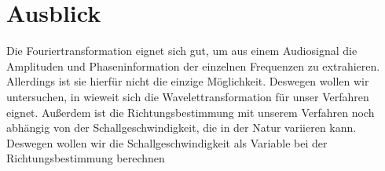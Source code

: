 \section{Ausblick} %
\iffalse
Da unser Verfahren über die Least Squares Methode sehr leicht auf eine beliebige Anzahl von Mikrofonen erweiterbar ist, wollen wir die Genauigkeit und insbesondere die Reichweite der Richtungsbestimmung noch weiter erhöhen, indem wir anstelle von vier Mikrofonen acht Mikrofone verwenden. Dies würde es uns außerdem erlauben, die Richtungsbestimmung unabhängig von der Schallgeschwindigkeit  durchzuführen, indem diese als eine weitere Variable eingeführt wird. Damit würde sich die Genauigkeit der Richtungsbestimmung weiter verbessern.

Weiterhin könnte die Richtungsbestimmung verbessert werden, indem auch die Amplituden mit einbezogen werden. Diese stehen durch die Fourier-Transformation bereits zur Verfügung und könnten ebenfalls zu einer weiteren Verbesserung der Reichweite und Genauigkeit der Richtungsbestimmung beitragen.
\fi
Die Fouriertransformation eignet sich gut, um aus einem Audiosignal die Amplituden und Phaseninformation der einzelnen Frequenzen zu extrahieren. Allerdings ist sie hierfür nicht die einzige Möglichkeit. Deswegen wollen wir untersuchen, in wieweit sich die Wavelettransformation für unser Verfahren eignet. Außerdem ist die Richtungsbestimmung mit unserem Verfahren noch abhängig von der Schallgeschwindigkeit, die in der Natur variieren kann. Deswegen wollen wir die Schallgeschwindigkeit als Variable bei der Richtungsbestimmung berechnen